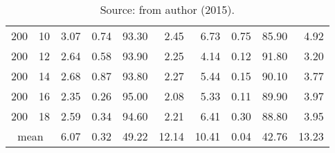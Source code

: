 \begin{table*}[h]
\begin{center}
\begin{tabular} {l l | r r r r | r r r r }
200  &             10  &  3.07   &            0.74             &               93.30  &  2.45   &  6.73   &            0.75             &               85.90  &  4.92   \\
200  &             12  &  2.64   &            0.58             &               93.90  &  2.25   &  4.14   &            0.12             &               91.80  &  3.20   \\
200  &             14  &  2.68   &            0.87             &               93.80  &  2.27   &  5.44   &            0.15             &               90.10  &  3.77   \\
200  &             16  &  2.35   &            0.26             &               95.00  &  2.08   &  5.33   &            0.11             &               89.90  &  3.97   \\
200  &             18  &  2.59   &            0.34             &               94.60  &  2.21   &  6.41   &            0.30             &               88.80  &  3.95   \\
\hline
\multicolumn{2}{c|}{mean} &  6.07   &            0.32             &               49.22  &  12.14  &  10.41  &            0.04             &               42.76  &  13.23  \\
\hline
\end{tabular}\caption*{Source: from author (2015).} 
\end{center}
\end{table*}


